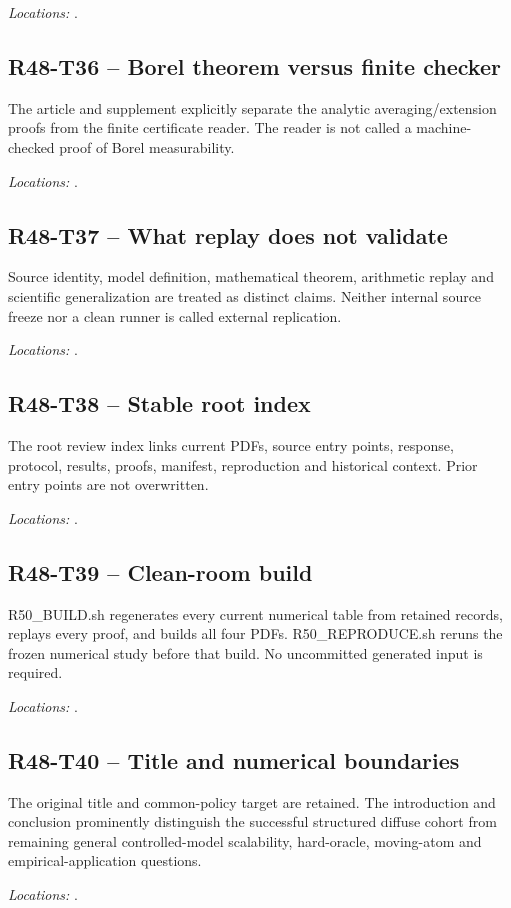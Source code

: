 \noindent\emph{Locations:} .

\subsection{R48-T36 -- Borel theorem versus finite checker}
The article and supplement explicitly separate the analytic averaging/extension proofs from the finite certificate reader. The reader is not called a machine-checked proof of Borel measurability.

\noindent\emph{Locations:} .

\subsection{R48-T37 -- What replay does not validate}
Source identity, model definition, mathematical theorem, arithmetic replay and scientific generalization are treated as distinct claims. Neither internal source freeze nor a clean runner is called external replication.

\noindent\emph{Locations:} .

\subsection{R48-T38 -- Stable root index}
The root review index links current PDFs, source entry points, response, protocol, results, proofs, manifest, reproduction and historical context. Prior entry points are not overwritten.

\noindent\emph{Locations:} .

\subsection{R48-T39 -- Clean-room build}
R50\_BUILD.sh regenerates every current numerical table from retained records, replays every proof, and builds all four PDFs. R50\_REPRODUCE.sh reruns the frozen numerical study before that build. No uncommitted generated input is required.

\noindent\emph{Locations:} .

\subsection{R48-T40 -- Title and numerical boundaries}
The original title and common-policy target are retained. The introduction and conclusion prominently distinguish the successful structured diffuse cohort from remaining general controlled-model scalability, hard-oracle, moving-atom and empirical-application questions.

\noindent\emph{Locations:} .


